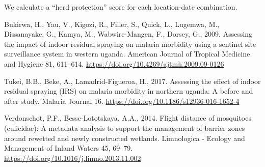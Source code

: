 \documentclass[]{article}
\begin{document}
We calculate a ``herd protection'' score for each location-date
combination.

\hypertarget{refs}{}
\hypertarget{ref-Bukirwa2009}{}
Bukirwa, H., Yau, V., Kigozi, R., Filler, S., Quick, L., Lugemwa, M.,
Dissanayake, G., Kamya, M., Wabwire-Mangen, F., Dorsey, G., 2009.
Assessing the impact of indoor residual spraying on malaria morbidity
using a sentinel site surveillance system in western uganda. American
Journal of Tropical Medicine and Hygiene 81, 611--614.
\url{https://doi.org/10.4269/ajtmh.2009.09-0126}

\hypertarget{ref-Tukei2017}{}
Tukei, B.B., Beke, A., Lamadrid-Figueroa, H., 2017. Assessing the effect
of indoor residual spraying (IRS) on malaria morbidity in northern
uganda: A before and after study. Malaria Journal 16.
\url{https://doi.org/10.1186/s12936-016-1652-4}

\hypertarget{ref-Verdonschot2014}{}
Verdonschot, P.F., Besse-Lototskaya, A.A., 2014. Flight distance of
mosquitoes (culicidae): A metadata analysis to support the management of
barrier zones around rewetted and newly constructed wetlands.
Limnologica - Ecology and Management of Inland Waters 45, 69--79.
\url{https://doi.org/10.1016/j.limno.2013.11.002}
\end{document}
